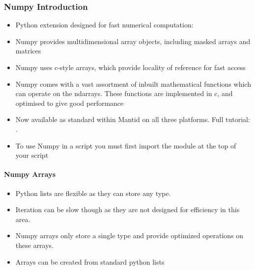 \documentclass[letterpaper,10pt,english,openany]{sphinxmanual}
\begin{document}
\subsubsection{Numpy Introduction}
\label{\detokenize{introduction_to_python/using_modules:numpy-introduction}}\begin{itemize}
\item {} 
Python extension designed for fast numerical computation:

\item {} 
Numpy provides multidimensional array objects, including masked
arrays and matrices

\item {} 
Numpy uses c-style arrays, which provide locality of reference for
fast access

\item {} 
Numpy comes with a vast assortment of inbuilt mathematical functions
which can operate on the ndarrays. These functions are implemented in
c, and optimised to give good performance

\item {} 
Now available as standard within Mantid on all three platforms. Full
tutorial: .

\item {} 
To use Numpy in a script you must first import the module at the top
of your script

\end{itemize}

\begin{sphinxVerbatim}[commandchars=\\\{\}]
 
\end{sphinxVerbatim}


\paragraph{Numpy Arrays}
\label{\detokenize{introduction_to_python/using_modules:numpy-arrays}}\begin{itemize}
\item {} 
Python lists are flexible as they can store any type.

\item {} 
Iteration can be slow though as they are not designed for efficiency
in this area.

\item {} 
Numpy arrays only store a single type and provide optimized
operations on these arrays.

\item {} 
Arrays can be created from standard python lists

\end{itemize}
\end{document}
